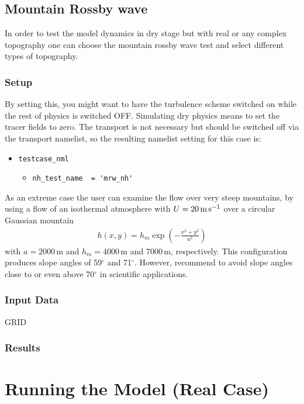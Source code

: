 \subsection{Mountain Rossby wave}

In order to test the model dynamics in dry stage but with real or any complex topography one can choose the mountain rossby wave test and select different types of topography.

\subsubsection{Setup}

 By setting this, you might want to have the turbulence scheme switched on while the rest of physics is switched OFF. Simulating dry physics means to set the tracer fields to zero. The transport is not necessary but should be switched off via the transport namelist, so the resulting namelist setting for this case is:
\begin{itemize}
\item \verb+testcase_nml+
 \begin{itemize}
  \item  \verb+nh_test_name  = 'mrw_nh'+
 \end{itemize}
\end{itemize}
As an extreme case the user can examine the flow over very steep mountains, by using a flow of an isothermal atmosphere with 
$U = 20  \rm \, m \, s^{-1}$ over a circular Gaussian mountain
\begin{align}
h(x,y) = h_m \exp \left( - \frac{x^2 + y^2}{a^2} \right)
\end{align}
with $a = 2000\,\mathrm{m}$ and $h_m = 4000\,\mathrm{m}$ and $7000\,\mathrm{m}$, respectively. 
This configuration produces slope angles of 59$^\circ$ and 71$^\circ$. However, \cite{Zaengl:2013} recommend  to avoid slope angles close to or even above 70$^\circ$ in scientific applications.

\subsubsection{Input Data}

GRID

\subsubsection{Results}



\section{Running the Model (Real Case)}
\label{chap:UG_running_model}


